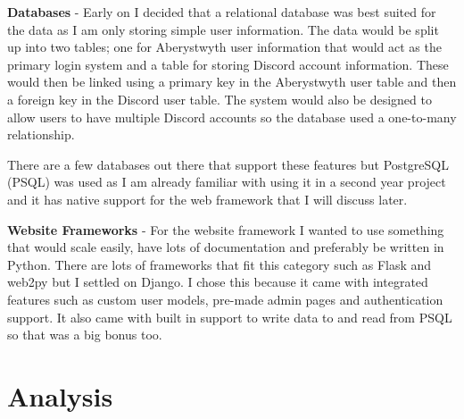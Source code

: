 \textbf{Databases} - Early on I decided that a relational database was best suited for the data as I am only storing simple user information. The data would be split up into two tables; one for Aberystwyth user information that would act as the primary login system and a table for storing Discord account information. These would then be linked using a primary key in the Aberystwyth user table and then a foreign key in the Discord user table. The system would also be designed to allow users to have multiple Discord accounts so the database used a one-to-many relationship. 

There are a few databases out there that support these features but PostgreSQL (PSQL) \cite{psql} was used as I am already familiar with using it in a second year project and it has native support for the web framework that I will discuss later.

\textbf{Website Frameworks} - For the website framework I wanted to use something that would scale easily, have lots of documentation and preferably be written in Python. There are lots of frameworks that fit this category such as Flask and web2py but I settled on Django. I chose this because it came with integrated features such as custom user models, pre-made admin pages and authentication support. It also came with built in support to write data to and read from PSQL \cite{psql} so that was a big bonus too.


\section{Analysis}
%
%
%

